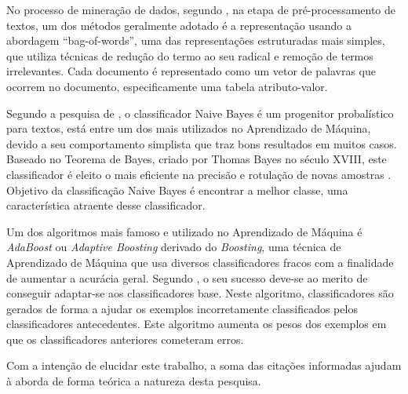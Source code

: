 No processo de mineração de dados, segundo \cite{matsubara2003pretext}, na 
etapa de pré-processamento de textos, um dos métodos geralmente adotado é a 
representação usando a abordagem ``bag-of-words'', uma das representações 
estruturadas mais simples, que utiliza técnicas de redução do termo ao seu 
radical e remoção de termos irrelevantes. Cada documento é  representado como 
um vetor de palavras que ocorrem no documento, especificamente uma tabela 
atributo-valor. 

Segundo a pesquisa de \cite{de2017mineraccao}, o classificador Naive Bayes é um 
progenitor probalístico para textos, está entre um dos mais utilizados no 
Aprendizado de Máquina, devido a seu comportamento simplista que traz bons 
resultados em muitos casos. Baseado no Teorema de Bayes, criado por Thomas 
Bayes no século XVIII, este classificador é eleito o mais eficiente na precisão 
e rotulação de novas amostras \cite{chakrabarti2002mining}. Objetivo da 
classificação Naive Bayes é encontrar a melhor classe, uma característica 
atraente desse classificador.

Um dos algoritmos mais famoso e utilizado no Aprendizado de Máquina é 
\textit{AdaBoost} ou \textit{Adaptive Boosting} derivado do \textit{Boosting}, 
uma técnica de Aprendizado de Máquina que usa diversos classificadores 
fracos com a finalidade de aumentar a acurácia geral. Segundo 
\cite{dos2015detecccao}, o seu sucesso deve-se ao merito de conseguir 
adaptar-se aos classificadores base. Neste algoritmo, classificadores são 
gerados de forma a ajudar os exemplos incorretamente classificados pelos
classificadores antecedentes. Este algoritmo aumenta os pesos dos exemplos em 
que os classificadores anteriores cometeram erros.

Com a intenção de elucidar este trabalho, a soma das citações informadas ajudam 
à aborda de forma teórica a natureza desta pesquisa.